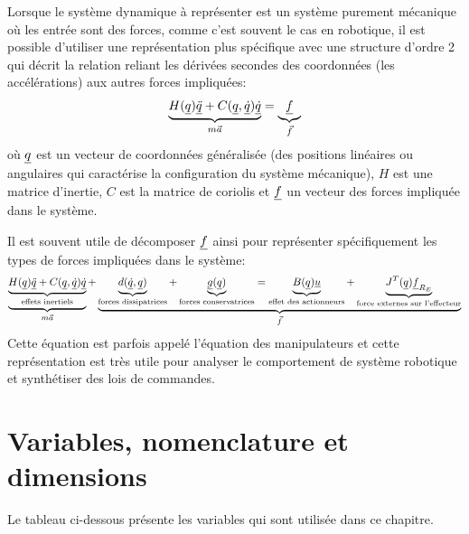 Lorsque le système dynamique à représenter est un système purement mécanique où les entrée sont des forces, comme c'est souvent le cas en robotique, il est possible d'utiliser une représentation plus spécifique avec une structure d'ordre 2 qui décrit la relation reliant les dérivées secondes des coordonnées (les accélérations) aux autres forces impliquées:
\begin{align}
\underbrace{
H(\underline{q}) \underline{\ddot{q}} + C(\underline{q},\underline{\dot{q}}) \underline{\dot{q}} 
}_{ m \Vec{a}}
=  
\underbrace{
\underline{f} 
}_{\Vec{f}}
\label{eq:mecdyn}
\end{align}
où $\underline{q}$ est un vecteur de coordonnées généralisée (des positions linéaires ou angulaires qui caractérise la configuration du système mécanique), $H$ est une matrice d'inertie, $C$ est la matrice de coriolis et $\underline{f}$ un vecteur des forces impliquée dans le système.

Il est souvent utile de décomposer $\underline{f}$ ainsi pour représenter spécifiquement les types de forces impliquées dans le système:
\begin{align}
\underbrace{
\underbrace{
H(\underline{q}) \underline{\ddot{q}} + C(\underline{q},\underline{\dot{q}}) \underline{\dot{q}} 
}_{\text{effets inertiels}}
}_{ m \Vec{a}}
+ 
\underbrace{
\underbrace{
d(\underline{\dot{q}},\underline{q}) 
}_{\text{forces dissipatrices}}
+ 
\underbrace{
\underline{g}(\underline{q}) 
}_{\text{forces conservatrices}}
= 
\underbrace{
B(\underline{q}) \underline{u} 
}_{\text{effet des actionneurs}}
+
\underbrace{
J^T(\underline{q}) \underline{f}_{R_E}
}_{\text{force externes sur l'effecteur}}
}_{\Vec{f}}
\label{eq:manipulator}
\end{align}
Cette équation est parfois appelé l'équation des manipulateurs et cette représentation est très utile pour analyser le comportement de système robotique et synthétiser des lois de commandes.

\section{Variables, nomenclature et dimensions}
\label{sec:dyamicnomenclature}

Le tableau ci-dessous présente les variables qui sont utilisée dans ce chapitre.

